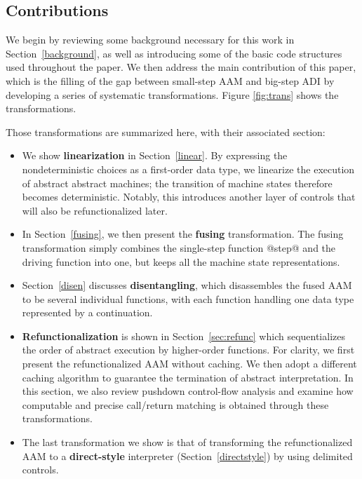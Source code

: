 \documentclass[acmsmall]{acmart}\settopmatter{}
\begin{document}
\subsection{Contributions}

We begin by reviewing some background necessary for this work in Section~\ref{background}, 
as well as introducing some of the basic code structures used throughout the paper. 
We then address the main contribution of this paper, which is the filling of the gap between
small-step AAM and big-step ADI by developing a series of systematic transformations. 
Figure \ref{fig:trans} shows the transformations.

Those transformations are summarized here, with their associated section:

\begin{itemize}
  \item We show \textbf{linearization} in Section~\ref{linear}. By expressing the
    nondeterministic choices as a first-order data type, we linearize the execution
    of abstract abstract machines; the transition of machine states therefore becomes 
    deterministic. Notably, this introduces another layer of controls that will also 
    be refunctionalized later.

  \item In Section~\ref{fusing}, we then present the \textbf{fusing} transformation.
    The fusing transformation simply combines the single-step function @step@ and the 
    driving function into one, but keeps all the machine state representations.

  \item Section~\ref{disen} discusses \textbf{disentangling}, which disassembles the 
    fused AAM to be several individual functions, with each function handling one data 
    type represented by a continuation.

  \item \textbf{Refunctionalization} is shown in Section~\ref{sec:refunc} which sequentializes
    the order of abstract execution by higher-order functions. For clarity, we first present 
    the refunctionalized AAM without caching. We then adopt a different caching algorithm to 
    guarantee the termination of abstract interpretation.
    In this section, we also review pushdown control-flow analysis and examine how computable
    and precise call/return matching is obtained through these transformations.

  \item The last transformation we show is that of transforming the refunctionalized AAM to a
    \textbf{direct-style} interpreter (Section~\ref{directstyle}) by using delimited controls.
\end{itemize}
\end{document}
